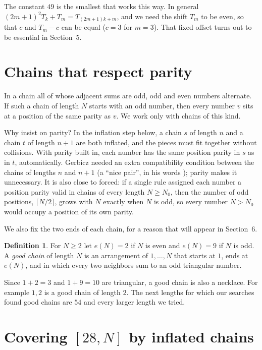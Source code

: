 \documentclass[11pt]{article}
\theoremstyle{definition}
\newtheorem{definition}[theorem]{Definition}
\theoremstyle{remark}
\begin{document}
The constant $49$ is the smallest that works this way. In general
$(2m+1)^2T_k+T_m=T_{(2m+1)k+m}$, and we need the shift $T_m$ to be even, so that $c$ and $T_m-c$
can be equal ($c=3$ for $m=3$). That fixed offset turns out to be essential in Section~5.

\section{Chains that respect parity}

In a chain all of whose adjacent sums are odd, odd and even numbers alternate. If such a chain of
length $N$ starts with an odd number, then every number $v$ sits at a position of the same parity
as $v$. We work only with chains of this kind.

Why insist on parity? In the inflation step below, a chain $s$ of length $n$ and a chain
$t$ of length $n+1$ are both inflated, and the pieces must fit together without collisions. With
parity built in, each number has the same position parity in $s$ as in $t$, automatically. Gerbicz
needed an extra compatibility condition between the chains of lengths $n$ and $n+1$ (a ``nice
pair'', in his words \cite{Gerbicz}); parity makes it unnecessary. It is also close to forced: if a single rule assigned each number a position
parity valid in chains of every length $N\ge N_0$, then the number of odd positions, $\lceil N/2\rceil$,
grows with $N$ exactly when $N$ is odd, so every number $N>N_0$ would occupy a position of its
own parity.

We also fix the two ends of each chain, for a reason that will appear in Section~6.

\begin{definition}
For $N\ge2$ let $e(N)=2$ if $N$ is even and $e(N)=9$ if $N$ is odd. A \emph{good chain} of length
$N$ is an arrangement of $1,\dots,N$ that starts at $1$, ends at $e(N)$, and in which every two
neighbors sum to an odd triangular number.
\end{definition}

Since $1+2=3$ and $1+9=10$ are triangular, a good chain is also a necklace. For example $1,2$ is a
good chain of length $2$. The next lengths for which our searches found good chains are $54$ and
every larger length we tried.

\section{Covering $[28,N]$ by inflated chains}
\end{document}
